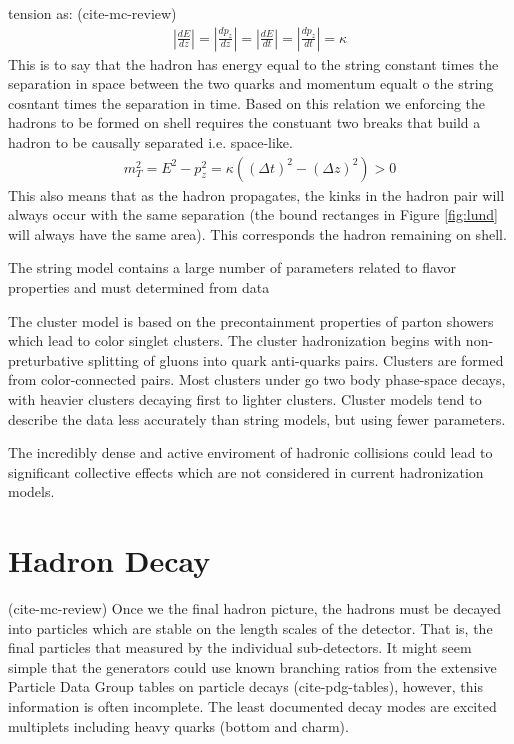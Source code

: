 tension as: (cite-mc-review)
\begin{align*}
\left |\frac{dE}{dz}\right|  = \left|\frac{dp_z}{dz}\right| = 
\left|\frac{dE}{dt}\right| = \left|\frac{dp_z}{dt}\right|  = \kappa
\end{align*}
This is to say that the hadron has energy equal to the string constant times the separation in space between the 
two quarks and momentum equalt o the string cosntant times the separation in time. Based on this relation we enforcing
 the hadrons to be formed on shell requires the constuant two breaks that build a hadron to be causally separated i.e. space-like. 
\begin{align*}
m_T^2 = E^2 - p_z^2 = \kappa((\Delta t)^2 - (\Delta z)^2) > 0 
\end{align*}
This also means that as the hadron propagates, the kinks in the hadron pair will always occur with the same separation
(the bound rectanges in Figure \ref{fig:lund} will always have the same area). This corresponds the hadron remaining on shell.

The string model contains a large number of parameters related to flavor properties and must determined from data

The cluster model is based on the precontainment properties of parton showers which lead to  color singlet clusters. The cluster hadronization begins with
non-preturbative splitting of gluons into quark anti-quarks pairs. Clusters are formed from color-connected pairs. Most clusters under go two body phase-space decays, 
with heavier clusters decaying first to lighter clusters. Cluster models tend to describe the data less accurately than 
string models, but using fewer parameters.

The incredibly dense and active enviroment of hadronic collisions could lead to significant collective effects
 which are not considered in current hadronization models.
\section{Hadron Decay} 

(cite-mc-review) Once we the final hadron picture, the hadrons must be decayed into particles which are stable on the length scales of the detector. That is,
the final particles that measured by the individual sub-detectors.  It might seem simple that the generators could use
 known branching ratios from the extensive Particle Data Group tables on particle decays (cite-pdg-tables), however, 
this information is often incomplete. The least documented decay modes are excited multiplets including heavy quarks (bottom and charm).

